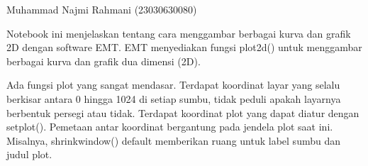 \documentclass[a4paper,10pt]{article}
\begin{document}
\begin{eulernotebook}
\begin{eulercomment}
Muhammad Najmi Rahmani   (23030630080)

Notebook ini menjelaskan tentang cara menggambar berbagai kurva dan
grafik 2D dengan software EMT. EMT menyediakan fungsi plot2d() untuk
menggambar berbagai kurva dan grafik dua dimensi (2D).\\
\end{eulercomment}
\begin{eulercomment}
Ada fungsi plot yang sangat mendasar. Terdapat koordinat layar yang
selalu berkisar antara 0 hingga 1024 di setiap sumbu, tidak peduli
apakah layarnya berbentuk persegi atau tidak. Terdapat koordinat plot
yang dapat diatur dengan setplot(). Pemetaan antar koordinat
bergantung pada jendela plot saat ini. Misalnya, shrinkwindow()
default memberikan ruang untuk label sumbu dan judul plot.


\end{eulercomment}
\end{eulernotebook}
\end{document}
